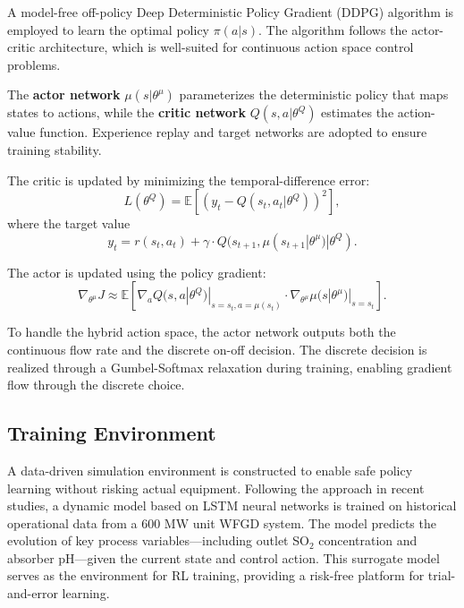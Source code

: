 \documentclass[journal]{IEEEtran}
\begin{document}
A model-free off-policy Deep Deterministic Policy Gradient (DDPG) algorithm is employed to learn the optimal policy $\pi(a|s)$. The algorithm follows the actor-critic architecture, which is well-suited for continuous action space control problems.

The \textbf{actor network} $\mu(s|\theta^\mu)$ parameterizes the deterministic policy that maps states to actions, while the \textbf{critic network} $Q(s,a|\theta^Q)$ estimates the action-value function. Experience replay and target networks are adopted to ensure training stability.

The critic is updated by minimizing the temporal-difference error:
\begin{equation}
L(\theta^Q) = \mathbb{E}\left[ \left( y_t - Q(s_t, a_t|\theta^Q) \right)^2 \right],
\end{equation}
where the target value
\begin{equation}
y_t = r(s_t, a_t) + \gamma \cdot Q(s_{t+1}, \mu(s_{t+1}|\theta^\mu)|\theta^Q).
\end{equation}

The actor is updated using the policy gradient:
\begin{equation}
\nabla_{\theta^\mu} J \approx \mathbb{E}\left[ \nabla_a Q(s,a|\theta^Q)|_{s=s_t,a=\mu(s_t)} \cdot \nabla_{\theta^\mu} \mu(s|\theta^\mu)|_{s=s_t} \right].
\end{equation}

To handle the hybrid action space, the actor network outputs both the continuous flow rate and the discrete on-off decision. The discrete decision is realized through a Gumbel-Softmax relaxation during training, enabling gradient flow through the discrete choice.

\subsection{Training Environment}

A data-driven simulation environment is constructed to enable safe policy learning without risking actual equipment. Following the approach in recent studies, a dynamic model based on LSTM neural networks is trained on historical operational data from a 600 MW unit WFGD system. The model predicts the evolution of key process variables---including outlet SO$_2$ concentration and absorber pH---given the current state and control action. This surrogate model serves as the environment for RL training, providing a risk-free platform for trial-and-error learning.
\end{document}
